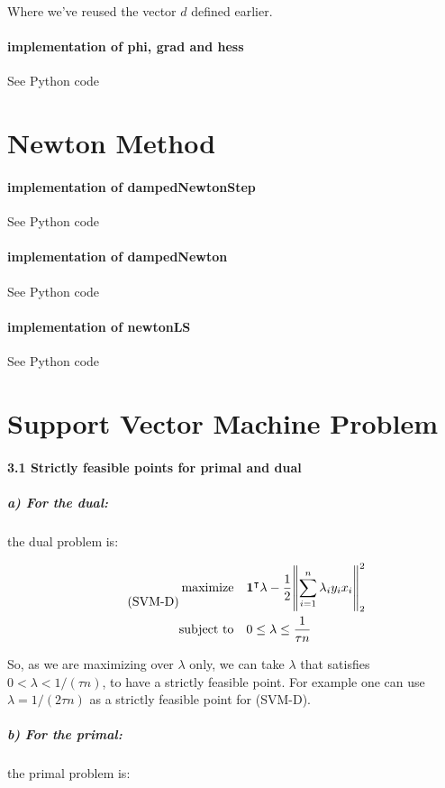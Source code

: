 \documentclass[11pt]{article}
\numberwithin{figure}{section} %
\begin{document}
Where we've reused the vector $d$ defined earlier.

\paragraph{implementation of phi, grad and hess} See Python code

\section{Newton Method}
\paragraph{implementation of dampedNewtonStep} See Python code
\paragraph{implementation of dampedNewton} See Python code
\paragraph{implementation of newtonLS} See Python code

\section{Support Vector Machine Problem}
\paragraph{3.1 Strictly feasible points for primal and dual}
\subparagraph{a) For the dual:} the dual problem is:

\begin{equation}\tag*{(SVM-D)}
	\begin{split}
	\text{maximize} \quad & \mathbf{1}^{\intercal} \lambda - \frac{1}{2} \norm{\sum\limits_{i=1}^n \lambda_i y_i x_i}^{2}_2 \\
	\text{subject to} \quad & 0 \leq \lambda \leq \frac{1}{\tau n}
	\end{split}
\end{equation}

So, as we are maximizing over $\lambda$ only, we can take $\lambda$ that satisfies $0 < \lambda < 1/(\tau n)$, to have a strictly feasible
point. For example one can use $\lambda = 1/(2 \tau n)$ as a strictly feasible point for (SVM-D).

\subparagraph{b) For the primal:} the primal problem is:
\end{document}
